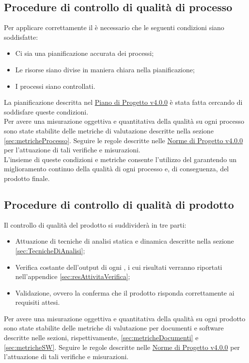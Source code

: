 \documentclass{scalatekids-article}
\begin{document}
\subsection{Procedure di controllo di qualità di processo}
Per applicare correttamente il  è necessario che le seguenti condizioni siano soddisfatte:
\begin{itemize}
\item{Ci sia una pianificazione accurata dei processi;}
\item{Le risorse siano divise in maniera chiara nella pianificazione;}
\item{I processi siano controllati.}
\end{itemize}
La pianificazione descritta nel \href{run:./PianoDiProgetto\_v4.0.0.pdf}{Piano di Progetto v4.0.0} è stata fatta cercando di soddisfare queste condizioni.\\
Per avere una misurazione oggettiva e quantitativa della qualità su ogni processo sono state stabilite delle metriche di valutazione descritte nella sezione \ref{sec:metricheProcesso}. Seguire le regole descritte nelle \href{run:../Interni/NormeDiProgetto\_v4.0.0.pdf}{Norme di Progetto v4.0.0} per l'attuazione di tali verifiche e misurazioni.\\
L'insieme di queste condizioni e metriche consente l'utilizzo del  garantendo un miglioramento continuo della qualità di ogni processo e, di conseguenza, del prodotto finale.
\subsection{Procedure di controllo di qualità di prodotto}
Il controllo di qualità del prodotto si suddividerà in tre parti:
\begin{itemize}
\item{Attuazione di tecniche di analisi statica e dinamica descritte nella sezione \ref{sec:TecnicheDiAnalisi};}
\item{Verifica costante dell'output di ogni , i cui risultati verranno riportati nell'appendice \ref{sec:resAttivitaVerifica};}
\item{Validazione, ovvero la conferma che il prodotto risponda correttamente ai requisiti attesi.}
\end{itemize}
Per avere una misurazione oggettiva e quantitativa della qualità su ogni prodotto sono state stabilite delle metriche di valutazione per documenti e software descritte nelle sezioni, rispettivamente, \ref{sec:metricheDocumenti} e \ref{sec:metricheSW}. Seguire le regole descritte nelle \href{run:../Interni/NormeDiProgetto\_v4.0.0.pdf}{Norme di Progetto v4.0.0} per l'attuazione di tali verifiche e misurazioni.\\
\end{document}
